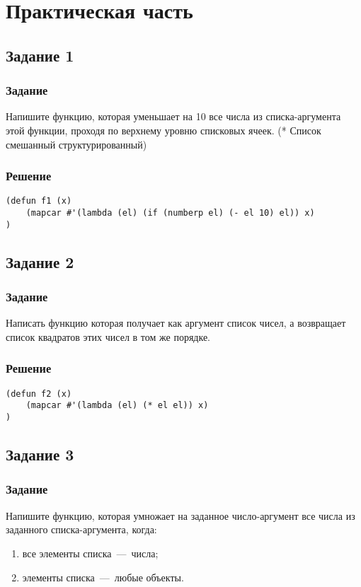\setcounter{page}{3}

\chapter{Практическая часть}

\section{Задание 1}
\subsection*{Задание}
Напишите функцию, которая уменьшает на 10 все числа из списка-аргумента этой
функции, проходя по верхнему уровню списковых ячеек. (* Список смешанный структурированный)

\subsection*{Решение}
\begin{code}
\begin{verbatim}
(defun f1 (x)
	(mapcar #'(lambda (el) (if (numberp el) (- el 10) el)) x)
)
\end{verbatim}
\end{code}

\section{Задание 2}
\subsection*{Задание}
Написать функцию которая получает как аргумент список чисел, а возвращает список квадратов этих чисел в том же порядке.

\subsection*{Решение}
\begin{code}
\begin{verbatim}
(defun f2 (x)
	(mapcar #'(lambda (el) (* el el)) x)
)
\end{verbatim}
\end{code}

\section{Задание 3}
\subsection*{Задание}
Напишите функцию, которая умножает на заданное число-аргумент все числа из заданного списка-аргумента, когда:
\begin{enumerate}
	\item все элементы списка~---~числа;
	\item элементы списка~---~любые объекты.
\end{enumerate}

